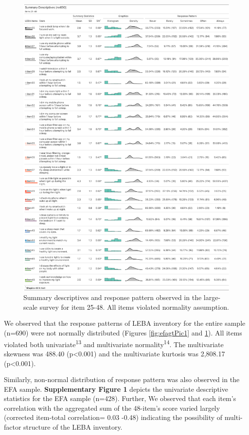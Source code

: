 \documentclass[
  man]{apa6}
\begin{document}
\begin{figure}
\includegraphics[width=2.5\linewidth,height=1\textheight]{Figures/Figure3} \caption{Summary descriptives and response pattern observed in the large-scale survey for item 25-48. All items violated normality assumption.}\label{fig:efagtPic2}
\end{figure}

We observed that the response patterns of LEBA inventory for the entire sample (n=690) were not normally distributed (Figures \ref{fig:efagtPic1} and \ref{fig:efagtPic2}). All items violated both univariate\textsuperscript{13} and multivariate normality\textsuperscript{14}. The multivariate skewness was 488.40 (p\textless0.001) and the multivariate kurtosis was 2,808.17 (p\textless0.001).

Similarly, non-normal distribution of response pattern was also observed in the EFA sample. \textbf{Supplementary Figure 1} depicts the univariate descriptive statistics for the EFA sample (n=428). Further, We observed that each item's correlation with the aggregated sum of the 48-item's score varied largely (corrected item-total correlation= 0.03 -0.48) indicating the possibility of multi-factor structure of the LEBA inventory.
\end{document}
